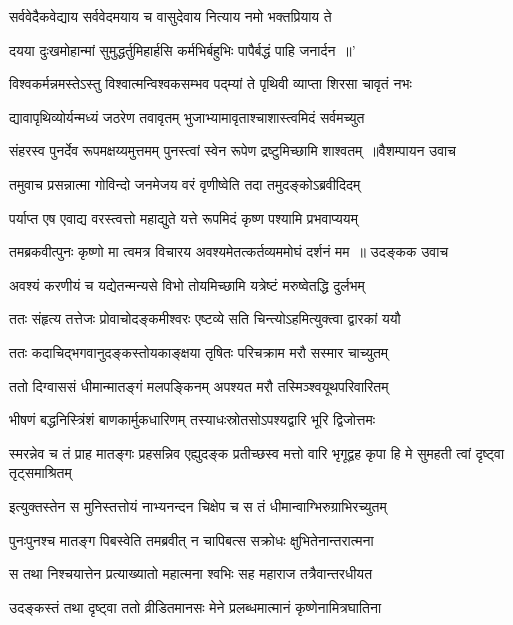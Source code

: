 \twolineshloka
{सर्ववेदैकवेद्याय सर्ववेदमयाय च}
{वासुदेवाय नित्याय नमो भक्तप्रियाय ते}


\twolineshloka
{दयया दुःखमोहान्मां सुमुद्धर्तुमिहार्हसि}
{कर्मभिर्बहुभिः पापैर्बद्धं पाहि जनार्दन ॥'}


\twolineshloka
{विश्वकर्मन्नमस्तेऽस्तु विश्वात्मन्विश्वकसम्भव}
{पद्म्यां ते पृथिवी व्याप्ता शिरसा चावृतं नभः}


\twolineshloka
{द्यावापृथिव्योर्यन्मध्यं जठरेण तवावृतम्}
{भुजाभ्यामावृताश्चाशास्त्वमिदं सर्वमच्युत}


\threelineshloka
{संहरस्व पुनर्देव रूपमक्षय्यमुत्तमम्}
{पुनस्त्वां स्वेन रूपेण द्रष्टुमिच्छामि शाश्वतम् ॥वैशम्पायन उवाच}
{}


\threelineshloka
{तमुवाच प्रसन्नात्मा गोविन्दो जनमेजय}
{वरं वृणीष्वेति तदा तमुदङ्कोऽब्रवीदिदम्}
{}


\twolineshloka
{पर्याप्त एष एवाद्य वरस्त्वत्तो महाद्युते}
{यत्ते रूपमिदं कृष्ण पश्यामि प्रभवाप्ययम्}


\threelineshloka
{तमब्रकवीत्पुनः कृष्णो मा त्वमत्र विचारय}
{अवश्यमेतत्कर्तव्यममोघं दर्शनं मम ॥ उदङ्कक उवाच}
{}


\twolineshloka
{अवश्यं करणीयं च यद्येतन्मन्यसे विभो}
{तोयमिच्छामि यत्रेष्टं मरुष्वेतद्धि दुर्लभम्}


\twolineshloka
{ततः संहृत्य तत्तेजः प्रोवाचोदङ्कमीश्वरः}
{एष्टव्ये सति चिन्त्योऽहमित्युक्त्वा द्वारकां ययौ}


\twolineshloka
{ततः कदाचिद्भगवानुदङ्कस्तोयकाङ्क्षया}
{तृषितः परिचक्राम मरौ सस्मार चाच्युतम्}


\twolineshloka
{ततो दिग्वाससं धीमान्मातङ्गं मलपङ्किनम्}
{अपश्यत मरौ तस्मिञ्श्वयूथपरिवारितम्}


\twolineshloka
{भीषणं बद्धनिस्त्रिंशं बाणकार्मुकधारिणम्}
{तस्याधःस्रोतसोऽपश्यद्वारि भूरि द्विजोत्तमः}


\threelineshloka
{स्मरन्नेव च तं प्राह मातङ्गः प्रहसन्निव}
{एह्युदङ्क प्रतीच्छस्व मत्तो वारि भृगूद्वह}
{कृपा हि मे सुमहती त्वां दृष्ट्वा तृट्समाश्रितम्}


\threelineshloka
{इत्युक्तस्तेन स मुनिस्तत्तोयं नाभ्यनन्दन}
{चिक्षेप च स तं धीमान्वाग्भिरुग्राभिरच्युतम्}
{}


\twolineshloka
{पुनःपुनश्च मातङ्ग पिबस्वेति तमब्रवीत्}
{न चापिबत्स सक्रोधः क्षुभितेनान्तरात्मना}


\twolineshloka
{स तथा निश्चयात्तेन प्रत्याख्यातो महात्मना}
{श्वभिः सह महाराज तत्रैवान्तरधीयत}


\twolineshloka
{उदङ्कस्तं तथा दृष्ट्वा ततो व्रीडितमानसः}
{मेने प्रलब्धमात्मानं कृष्णेनामित्रघातिना}


